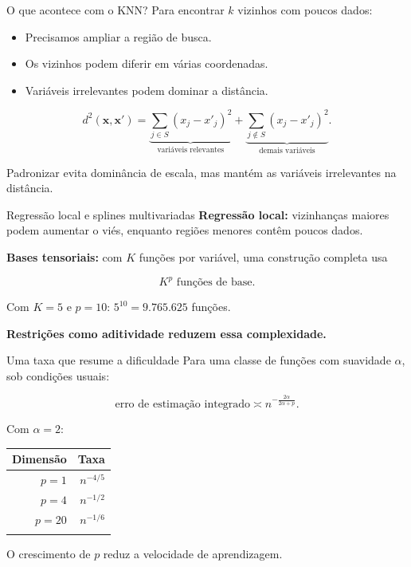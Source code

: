 \documentclass[
  10pt,
  ignorenonframetext,
  aspectratio=169,
  brazilian,
]{beamer}
\newcounter{none} %
\providecommand{\tightlist}{%
  \setlength{\itemsep}{0pt}\setlength{\parskip}{0pt}}
\begin{document}
\begin{frame}{O que acontece com o KNN?}
\protect{}\label{o-que-acontece-com-o-knn}
Para encontrar \(k\) vizinhos com poucos dados:

\begin{itemize}
\tightlist
\item
  Precisamos ampliar a região de busca.
\item
  Os vizinhos podem diferir em várias coordenadas.
\item
  Variáveis irrelevantes podem dominar a distância.
\end{itemize}

\[
d^2(\mathbf x,\mathbf x')=
\underbrace{\sum_{j\in S}(x_j-x'_j)^2}_{\text{variáveis relevantes}}
+
\underbrace{\sum_{j\notin S}(x_j-x'_j)^2}_{\text{demais variáveis}}.
\]

Padronizar evita dominância de escala, mas mantém as variáveis
irrelevantes na distância.
\end{frame}

\begin{frame}{Regressão local e splines multivariadas}
\protect{}\label{regressuxe3o-local-e-splines-multivariadas}
\textbf{Regressão local:} vizinhanças maiores podem aumentar o viés,
enquanto regiões menores contêm poucos dados.

\textbf{Bases tensoriais:} com \(K\) funções por variável, uma
construção completa usa

\[
\boxed{K^p\text{ funções de base}.}
\]

Com \(K=5\) e \(p=10\): \(5^{10}=9.765.625\) funções.

\textbf{Restrições como aditividade reduzem essa complexidade.}
\end{frame}

\begin{frame}{Uma taxa que resume a dificuldade}
\protect{}\label{uma-taxa-que-resume-a-dificuldade}
Para uma classe de funções com suavidade \(\alpha\), sob condições
usuais:

\[
\text{erro de estimação integrado}\asymp
n^{-\frac{2\alpha}{2\alpha+p}}.
\]

Com \(\alpha=2\):

{\def\LTcaptype{none} %
\begin{longtable}[]{@{}rr@{}}
\toprule\noalign{}
Dimensão & Taxa \\
\midrule\noalign{}
\endhead
\(p=1\) & \(n^{-4/5}\) \\
\(p=4\) & \(n^{-1/2}\) \\
\(p=20\) & \(n^{-1/6}\) \\
\bottomrule\noalign{}
\end{longtable}
}

O crescimento de \(p\) reduz a velocidade de aprendizagem.

\end{frame}
\end{document}
